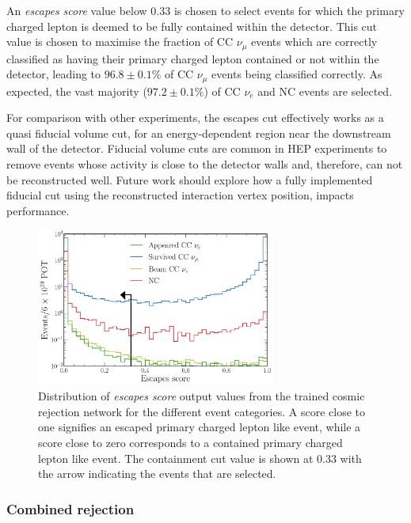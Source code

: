 An \emph{escapes score} value below $0.33$ is chosen to select events for which the primary
charged lepton is deemed to be fully contained within the detector. This cut value is chosen to
maximise the fraction of CC $\nu_{\mu}$ events which are correctly classified as having their
primary charged lepton contained or not within the detector, leading to $96.8\pm0.1\%$ of CC
$\nu_{\mu}$ events being classified correctly. As expected, the vast majority ($97.2\pm0.1\%$) of
CC $\nu_{e}$ and NC events are selected.

For comparison with other experiments, the escapes cut effectively works as a quasi fiducial
volume cut, for an energy-dependent region near the downstream wall of the detector. Fiducial
volume cuts are common in HEP experiments to remove events whose activity is close to the detector
walls and, therefore, can not be reconstructed well. Future work should explore how a fully
implemented fiducial cut using the reconstructed interaction vertex position, impacts performance.

\begin{figure} %
    \includegraphics[width=0.7\textwidth]{diagrams/7-results/final_escapes_outputs.pdf}
    \caption[Distribution of escapes score output values]
    {Distribution of \emph{escapes score} output values from the trained cosmic rejection network
        for the different event categories. A score close to one signifies an escaped primary
        charged lepton like event, while a score close to zero corresponds to a contained primary
        charged lepton like event. The containment cut value is shown at 0.33 with the arrow
        indicating the events that are selected.}
    \label{fig:final_escapes_outputs}
\end{figure}

\subsubsection*{Combined rejection} %

